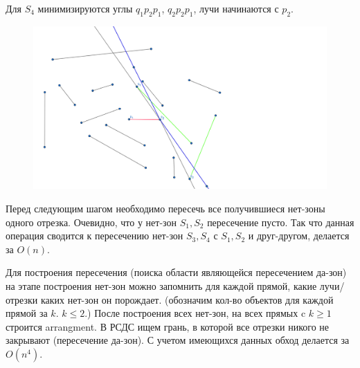 \documentclass[letterpaper,12pt]{article}
\begin{document}
Для $S_4$ минимизируются углы $q_1 p_2 p_1$, $q_2 p_2 p_1$,
лучи начинаются с $p_2$.
\begin{figure}[H]
      \centering
      \includegraphics[width=0.5\linewidth]{rays_4.png}
\end{figure}

Перед следующим шагом необходимо пересечь все получившиеся
нет-зоны одного отрезка. Очевидно, что у нет-зон $S_1, S_2$
пересечение пусто. Так что данная операция сводится к пересечению
нет-зон $S_3, S_4$ с $S_1, S_2$ и друг-другом, делается за $O(n)$.

Для построения пересечения (поиска области являющейся
пересечением да-зон) на этапе построения нет-зон можно запомнить
для каждой прямой, какие лучи/отрезки каких нет-зон он порождает.
(обозначим кол-во объектов для каждой прямой за $k$. $k \leq 2$.)
После построения всех нет-зон, на всех прямых c $k \geq 1$
строится arrangment. В РСДС ищем грань, в которой все отрезки
никого не закрывают (пересечение да-зон). С учетом имеющихся
данных обход делается за $O(n^4)$.
\end{document}
